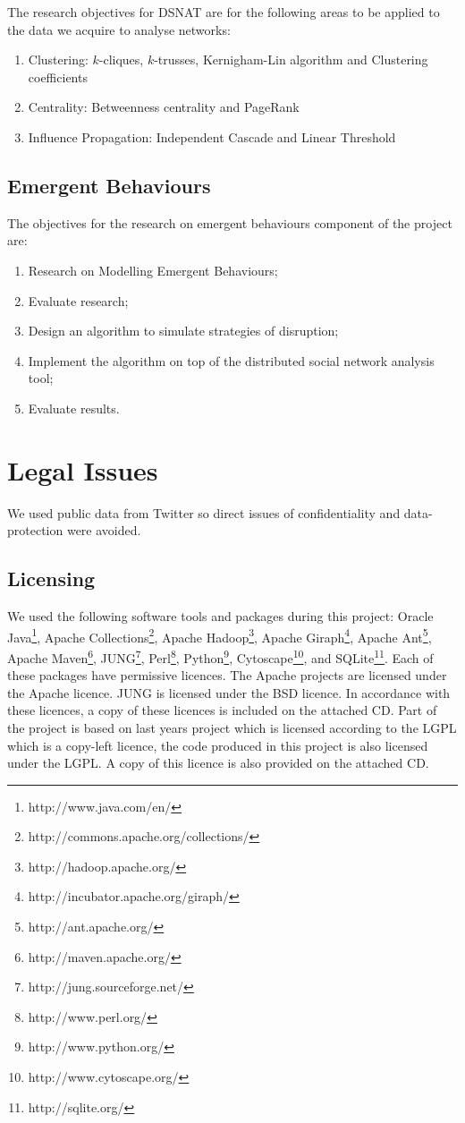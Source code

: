 The research objectives for DSNAT are for the following areas to be applied to the data we acquire to analyse networks:

\begin{enumerate}
	\item Clustering: $k$-cliques, $k$-trusses, Kernigham-Lin algorithm and Clustering coefficients
	\item Centrality: Betweenness centrality and PageRank
	\item Influence Propagation: Independent Cascade and Linear Threshold
\end{enumerate}

\subsection{Emergent Behaviours}

The objectives for the research on emergent behaviours component of the project are:

\begin{enumerate}
	\item Research on Modelling Emergent Behaviours;
	\item Evaluate research;
	\item Design an algorithm to simulate strategies of disruption;
	\item Implement the algorithm on top of the distributed social network analysis tool;
	\item Evaluate results.
\end{enumerate}

\section{Legal Issues}

We used public data from Twitter so direct issues of confidentiality and data-protection were avoided.

\subsection{Licensing}

We used the following software tools and packages during this project: Oracle Java\footnote{http://www.java.com/en/}, Apache Collections\footnote{http://commons.apache.org/collections/}, Apache Hadoop\footnote{http://hadoop.apache.org/}, Apache Giraph\footnote{http://incubator.apache.org/giraph/}, Apache Ant\footnote{http://ant.apache.org/}, Apache Maven\footnote{http://maven.apache.org/}, JUNG\footnote{http://jung.sourceforge.net/}, Perl\footnote{http://www.perl.org/}, Python\footnote{http://www.python.org/}, Cytoscape\footnote{http://www.cytoscape.org/}, and SQLite\footnote{http://sqlite.org/}. Each of these packages have permissive licences. The Apache projects are licensed under the Apache licence. JUNG is licensed under the BSD licence. In accordance with these licences, a copy of these licences is included on the attached CD. Part of the project is based on last years project which is licensed according to the LGPL which is a copy-left licence, the code produced in this project is also licensed under the LGPL. A copy of this licence is also provided on the attached CD.

